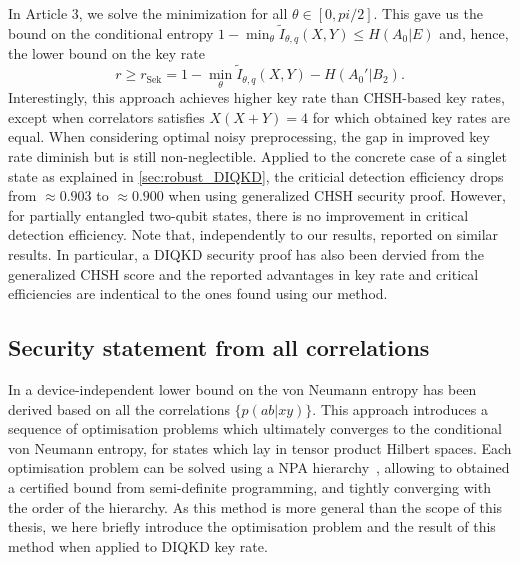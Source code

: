 In Article 3, we solve the minimization for all $\theta\in[0,pi/2]$. This gave us the bound on the conditional entropy $1-\min_{\theta}\tilde{I}_{\theta,q}(X,Y)\leq H(A_0|E)$ and, hence, the lower bound on the key rate
\begin{equation}
	r \geq r_\mathrm{Sek} = 1 - \min_{\theta} \tilde{I}_{\theta,q}(X,Y) - H(A_0'|B_2).
	\label{eq:Sekatstki}
\end{equation}
Interestingly, this approach achieves higher key rate than CHSH-based key rates, except when correlators satisfies $X(X+Y)=4$ for which obtained key rates are equal.
When considering optimal noisy preprocessing, the gap in improved key rate diminish but is still non-neglectible.
Applied to the concrete case of a singlet state as explained in \ref{sec:robust_DIQKD}, the criticial detection efficiency drops from $\approx 0.903$ to $\approx 0.900$ when using generalized CHSH security proof.
However, for partially entangled two-qubit states, there is no improvement in critical detection efficiency.
Note that, independently to our results, \cite{Woodhead2021} reported on similar results. In particular, a DIQKD security proof has also been dervied from the generalized CHSH score and the reported advantages in key rate and critical efficiencies are indentical to the ones found using our method.

\medbreak


\subsection{Security statement from all correlations}
\label{sec:Brown}

In \cite{Brown2021} a device-independent lower bound on the von Neumann entropy has been derived based on all the correlations $\{p(ab|xy)\}$.
This approach introduces a sequence of optimisation problems which ultimately converges to the conditional von Neumann entropy, for states which lay in tensor product Hilbert spaces.
Each optimisation problem can be solved using a NPA hierarchy~\cite{Navascues2007,Pironio2010}, allowing to obtained a certified bound from semi-definite programming, and tightly converging with the order of the hierarchy.
As this method is more general than the scope of this thesis, we here briefly introduce the optimisation problem and the result of this method when applied to DIQKD key rate.

\medbreak

